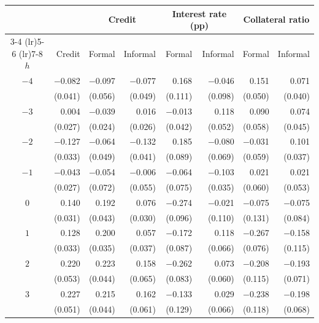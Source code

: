 \begin{threeparttable}
\caption{Annual event study coefficients by horizon}
\label{tab:event_horizons}
\begin{tabular}{@{}crrrrrrr@{}}
\toprule
 & & \multicolumn{2}{c}{Credit} & \multicolumn{2}{c}{Interest rate (pp)} & \multicolumn{2}{c}{Collateral ratio} \\
\cmidrule(lr){3-4} \cmidrule(lr){5-6} \cmidrule(lr){7-8}
$h$ & Credit & Formal & Informal & Formal & Informal & Formal & Informal \\
\midrule
$-4$ & $-$0.082\sym{**} & $-$0.097\sym{*} & $-$0.077 & 0.168 & $-$0.046 & 0.151\sym{***} & 0.071\sym{*} \\
 & (0.041) & (0.056) & (0.049) & (0.111) & (0.098) & (0.050) & (0.040) \\
$-3$ & 0.004 & $-$0.039 & 0.016 & $-$0.013 & 0.118\sym{**} & 0.090 & 0.074 \\
 & (0.027) & (0.024) & (0.026) & (0.042) & (0.052) & (0.058) & (0.045) \\
$-2$ & $-$0.127\sym{***} & $-$0.064 & $-$0.132\sym{***} & 0.185\sym{**} & $-$0.080 & $-$0.031 & 0.101\sym{***} \\
 & (0.033) & (0.049) & (0.041) & (0.089) & (0.069) & (0.059) & (0.037) \\
$-1$ & $-$0.043 & $-$0.054 & $-$0.006 & $-$0.064 & $-$0.103\sym{***} & 0.021 & 0.021 \\
 & (0.027) & (0.072) & (0.055) & (0.075) & (0.035) & (0.060) & (0.053) \\
$0$ & 0.140\sym{***} & 0.192\sym{***} & 0.076\sym{***} & $-$0.274\sym{***} & $-$0.021 & $-$0.075 & $-$0.075 \\
 & (0.031) & (0.043) & (0.030) & (0.096) & (0.110) & (0.131) & (0.084) \\
$1$ & 0.128\sym{***} & 0.200\sym{***} & 0.057 & $-$0.172\sym{**} & 0.118\sym{*} & $-$0.267\sym{***} & $-$0.158 \\
 & (0.033) & (0.035) & (0.037) & (0.087) & (0.066) & (0.076) & (0.115) \\
$2$ & 0.220\sym{***} & 0.223\sym{***} & 0.158\sym{**} & $-$0.262\sym{***} & 0.073 & $-$0.208\sym{*} & $-$0.193\sym{***} \\
 & (0.053) & (0.044) & (0.065) & (0.083) & (0.060) & (0.115) & (0.071) \\
$3$ & 0.227\sym{***} & 0.215\sym{***} & 0.162\sym{***} & $-$0.133 & 0.029 & $-$0.238\sym{**} & $-$0.198\sym{***} \\
 & (0.051) & (0.044) & (0.061) & (0.129) & (0.066) & (0.118) & (0.068) \\

\end{tabular}
\end{threeparttable}
